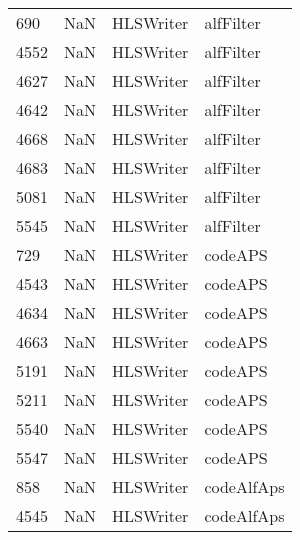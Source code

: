 \begin{tabular}{llll}
690  &                   NaN &                  HLSWriter &                                 alfFilter \\
4552 &                   NaN &                  HLSWriter &                                 alfFilter \\
4627 &                   NaN &                  HLSWriter &                                 alfFilter \\
4642 &                   NaN &                  HLSWriter &                                 alfFilter \\
4668 &                   NaN &                  HLSWriter &                                 alfFilter \\
4683 &                   NaN &                  HLSWriter &                                 alfFilter \\
5081 &                   NaN &                  HLSWriter &                                 alfFilter \\
5545 &                   NaN &                  HLSWriter &                                 alfFilter \\
729  &                   NaN &                  HLSWriter &                                   codeAPS \\
4543 &                   NaN &                  HLSWriter &                                   codeAPS \\
4634 &                   NaN &                  HLSWriter &                                   codeAPS \\
4663 &                   NaN &                  HLSWriter &                                   codeAPS \\
5191 &                   NaN &                  HLSWriter &                                   codeAPS \\
5211 &                   NaN &                  HLSWriter &                                   codeAPS \\
5540 &                   NaN &                  HLSWriter &                                   codeAPS \\
5547 &                   NaN &                  HLSWriter &                                   codeAPS \\
858  &                   NaN &                  HLSWriter &                                codeAlfAps \\
4545 &                   NaN &                  HLSWriter &                                codeAlfAps \\

\end{tabular}
